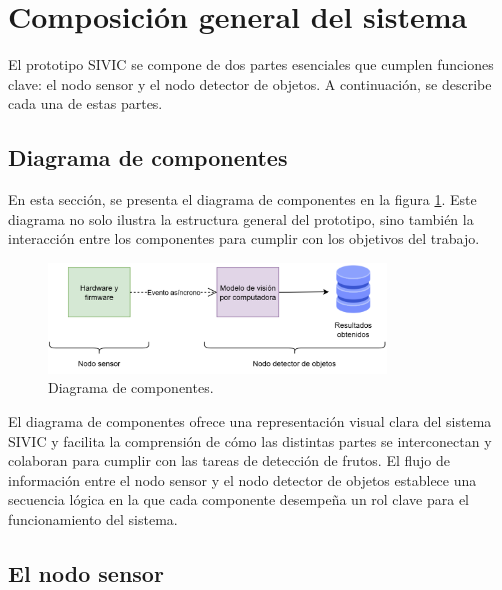 \section{Composición general del sistema}

El prototipo SIVIC se compone de dos partes esenciales que cumplen funciones clave: el nodo sensor y el nodo detector de objetos. A continuación, se describe cada una de estas partes.

\subsection{Diagrama de componentes}

En esta sección, se presenta el diagrama de componentes en la figura \ref{fig:diagrama_de_componentes}. Este diagrama no solo ilustra la estructura general del prototipo, sino también la interacción entre los componentes para cumplir con los objetivos del trabajo.

\vspace{1cm}

\begin{figure}[htbp]
	\centering
	\includegraphics[width=0.8\textwidth, height=0.2\textheight]{./Figures/diagrama_de_componentes.png}
	\caption{Diagrama de componentes.}
	\label{fig:diagrama_de_componentes}
\end{figure}

\vspace{1cm}

El diagrama de componentes ofrece una representación visual clara del sistema SIVIC y facilita la comprensión de cómo las distintas partes se interconectan y colaboran para cumplir con las tareas de detección de frutos. El flujo de información entre el nodo sensor y el nodo detector de objetos establece una secuencia lógica en la que cada componente desempeña un rol clave para el funcionamiento del sistema.



\subsection{El nodo sensor}

